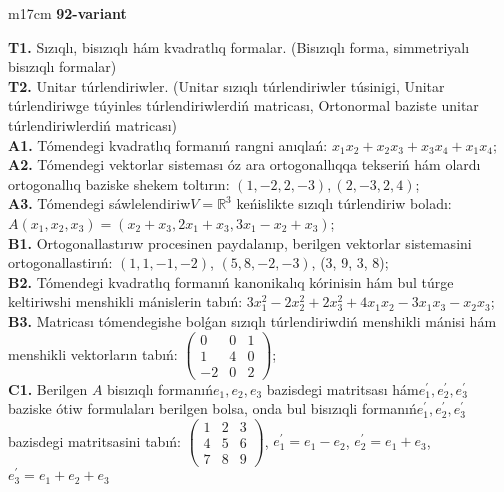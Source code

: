 \documentclass{article}
\begin{document}
\begin{tabular}{m{17cm}}
\textbf{92-variant}
\newline

\textbf{T1.} Sızıqlı, bisızıqlı hám kvadratlıq formalar. (Bisızıqlı forma,  simmetriyalı bisızıqlı formalar)  \\
\textbf{T2.} Unitar túrlendiriwler. (Unitar sızıqlı túrlendiriwler túsinigi,  Unitar túrlendiriwge túyinles túrlendiriwlerdiń matricası,   Ortonormal baziste unitar túrlendiriwlerdiń matricası) \\
\textbf{A1.} Tómendegi kvadratlıq formanıń rangni anıqlań: \(x_{1}x_{2} + x_{2}x_{3} + x_{3}x_{4} + x_{1}x_{4}\); \\
\textbf{A2.} Tómendegi vektorlar sisteması óz ara ortogonallıqqa tekseriń hám olardı ortogonallıq baziske shekem toltırın: \((1, - 2,2, - 3),(2, - 3,2,4)\); \\
\textbf{A3.} Tómendegi sáwlelendiriw\(V = \mathbb{R}^{3}\) keńislikte sızıqlı túrlendiriw boladı: \(A\left( x_{1},x_{2},x_{3} \right) = \left( x_{2} + x_{3},2x_{1} + x_{3},3x_{1} - x_{2} + x_{3} \right)\); \\
\textbf{B1.} Ortogonallastırıw procesinen paydalanıp, berilgen vektorlar sistemasini ortogonallastirıń: \((1,1, - 1, - 2)\), \((5,8, - 2, - 3)\), (3, 9, 3, 8); \\
\textbf{B2.} Tómendegi kvadratlıq formanıń kanonikalıq kórinisin hám bul túrge keltiriwshi menshikli mánislerin tabıń: \(3x_{1}^{2} - 2x_{2}^{2} + 2x_{3}^{2} + 4x_{1}x_{2} - 3x_{1}x_{3} - x_{2}x_{3}\); \\
\textbf{B3.} Matricası tómendegishe bolǵan sızıqlı túrlendiriwdiń menshikli mánisi hám menshikli vektorların tabıń: \(\begin{pmatrix} 0 & 0 & 1 \\ 1 & 4 & 0 \\  - 2 & 0 & 2 \end{pmatrix}\); \\
\textbf{C1.} Berilgen \(A\) bisızıqlı formanıń\(e_{1},e_{2},e_{3}\) bazisdegi matritsası hám\(e_{1}^{'},e_{2}^{'},e_{3}^{'}\) baziske ótiw formulaları berilgen bolsa, onda bul bisızıqli formanıń\(e_{1}^{'},e_{2}^{'},e_{3}^{'}\) bazisdegi matritsasini tabıń: \(\begin{pmatrix} 1 & 2 & 3 \\ 4 & 5 & 6 \\ 7 & 8 & 9 \end{pmatrix}\), \(e_{1}^{'} = e_{1} - e_{2}\), \(e_{2}^{'} = e_{1} + e_{3}\), \(e_{3}^{'} = e_{1} + e_{2} + e_{3}\) \\

\end{tabular}
\end{document}
